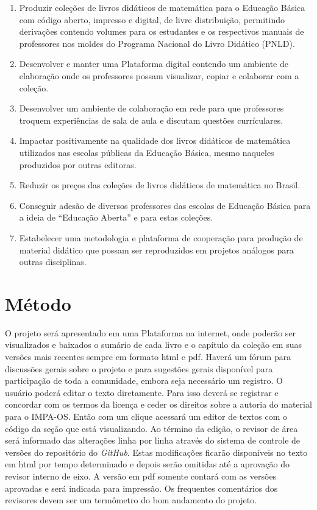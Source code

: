 \documentclass[10 pt]{article}
\begin{document}
\begin{enumerate} [\quad a)] %
  \item     Produzir coleções de livros didáticos de matemática para o Educação Básica com código aberto, impresso e digital, de livre distribuição, permitindo derivações contendo volumes para os estudantes e os respectivos manuais de professores nos moldes do Programa Nacional do Livro Didático (PNLD).
  \item     Desenvolver e manter uma Plataforma digital contendo um ambiente de elaboração onde os professores possam visualizar, copiar e colaborar com a coleção.
  \item Desenvolver um ambiente de colaboração em rede para que professores troquem experiências de sala de aula e discutam questões currículares.
  \item     Impactar positivamente na qualidade dos livros didáticos de matemática utilizados nas escolas públicas da Educação  Básica, mesmo naqueles produzidos por outras editoras.
  \item     Reduzir os preços das coleções de livros didáticos de matemática no Brasil.
  \item     Conseguir adesão de diversos professores das escolas de Educação Básica para a ideia de ``Educação Aberta'' e para estas coleções.
  \item     Estabelecer uma metodologia e plataforma de cooperação para produção de material didático que possam ser reproduzidos em projetos análogos para outras disciplinas.
\end{enumerate} %



\section{Método}

O projeto será apresentado em uma Plataforma na internet, onde poderão ser visualizados e baixados o sumário de cada livro e o capítulo da coleção em suas versões mais recentes sempre em formato html e pdf.
Haverá um fórum para discussões gerais sobre o projeto e para sugestões gerais disponível para participação de toda a comunidade, embora seja necessário um registro.
O usuário poderá editar o texto diretamente.
Para isso deverá se registrar e concordar com os termos da licença e ceder os direitos sobre a autoria do material para o IMPA-OS.
Então com um clique acessará um editor de textos com o código da seção que está visualizando.
Ao término da edição, o revisor de área será informado das alterações linha por linha através do sistema de controle de versões do repositório do  {\it GitHub}.
Estas modificações ficarão disponíveis no texto em html por tempo determinado e depois serão omitidas até a aprovação do revisor interno de eixo. 
A versão em pdf somente contará com as versões aprovadas e será indicada para impressão.
Os frequentes comentários dos revisores devem ser um termômetro do bom andamento do projeto.
\end{document}
